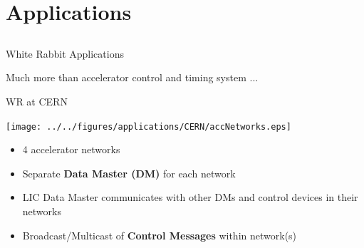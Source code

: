 \documentclass[compress,red]{beamer}
\begin{document}
\section{Applications}
\subsection{}
\begin{frame}{White Rabbit Applications}

    \begin{center}
      Much more than accelerator control and timing system ...
    \end{center}


\end{frame}
\begin{frame}{WR at CERN}

      \begin{center}
      \texttt{[image: ../../figures/applications/CERN/accNetworks.eps]}
      \end{center}

  \begin{itemize}
    \item 4 accelerator networks
    \item Separate {\bf Data Master (DM)} for each network
    \item \textcolor{green!90}{LIC Data Master} communicates with other DMs and control devices in their networks
    \item Broadcast/Multicast of {\bf Control Messages} within network(s)
  \end{itemize}

\end{frame}
\end{document}
